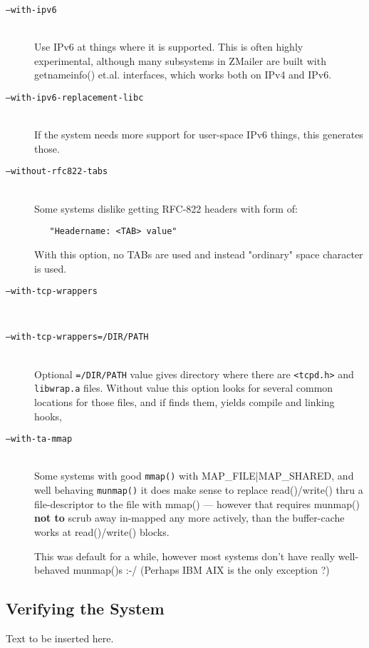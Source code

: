 \begin{description}
\item[\tt ---with-ipv6] \mbox{} \\
Use IPv6 at things where it is supported.  This is often
highly experimental, although many subsystems in ZMailer
are built with   getnameinfo()  et.al. interfaces, which
works both on IPv4 and IPv6.

\item[\tt ---with-ipv6-replacement-libc] \mbox{} \\
If the system needs more support for user-space IPv6
things, this generates those.

\item[\tt ---without-rfc822-tabs] \mbox{} \\
Some systems dislike getting RFC-822 headers with form of:
\begin{verbatim}
   "Headername: <TAB> value"
\end{verbatim}
With this option, no TABs are used and instead "ordinary"
space character is used.

\item[\tt ---with-tcp-wrappers] \mbox{} \\
\item[\tt ---with-tcp-wrappers=/DIR/PATH] \mbox{} \\
Optional  {\tt =/DIR/PATH}  value gives directory where there are
{\tt <tcpd.h>}  and  {\tt libwrap.a}  files.
Without value this option looks for several common locations
for those files, and if finds them, yields compile and linking
hooks,

\item[\tt ---with-ta-mmap] \mbox{} \\
Some systems with good {\tt mmap()} with MAP\_FILE|MAP\_SHARED,
and well behaving  {\tt munmap()}  it does make sense to replace
read()/write() thru a file-descriptor to the file with
mmap() --- however that requires munmap() {\bf not to} scrub
away in-mapped any more actively, than the buffer-cache
works at read()/write() blocks.

This was default for a while, however most systems don't
have really well-behaved munmap()s :-/
(Perhaps IBM AIX is the only exception ?)

\end{description}

\subsection{Verifying the System}

Text to be inserted here.

